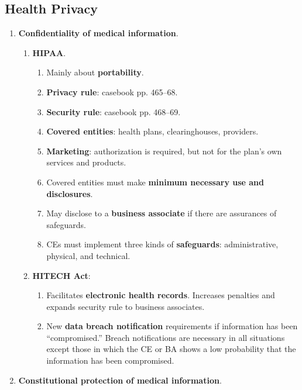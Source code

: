 \newpage

\subsection{Health Privacy}

\begin{enumerate}
    \item \textbf{Confidentiality of medical information}.
    \begin{enumerate}
        \item \textbf{HIPAA}.
        \begin{enumerate}
            \item Mainly about \textbf{portability}.
            \item \textbf{Privacy rule}: casebook pp. 465--68.
            \item \textbf{Security rule}: casebook pp. 468--69.
            \item \textbf{Covered entities}: health plans, clearinghouses, 
            providers.
            \item \textbf{Marketing}: authorization is required, but not for 
            the plan's own services and products.
            \item Covered entities must make \textbf{minimum necessary use and 
            disclosures}.
            \item May disclose to a \textbf{business associate} if there are 
            assurances of safeguards.
            \item CEs must implement three kinds of \textbf{safeguards}: 
            administrative, physical, and technical.
        \end{enumerate}
        \item \textbf{HITECH Act}:
        \begin{enumerate}
            \item Facilitates \textbf{electronic health records}. Increases 
            penalties and expands security rule to business associates.
            \item New \textbf{data breach notification} requirements if 
            information has been ``compromised.'' Breach notifications are 
            necessary in all situations except those in which the CE or BA 
            shows a low probability that the information has been compromised.
        \end{enumerate}
    \end{enumerate}
    \item \textbf{Constitutional protection of medical information}.

\end{enumerate}
